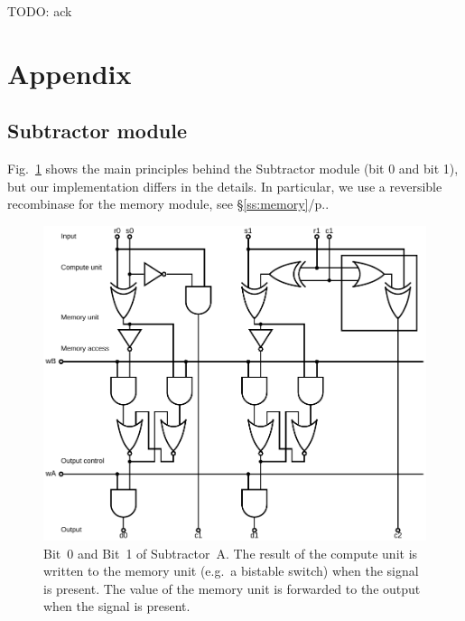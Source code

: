 \documentclass[12pt,notitlepage]{article}
\newcommand{\TODO}[1]{\textrm{\color{red}TODO: #1}}
\begin{document}
\TODO{ack}




\footnotesize


\normalsize

\clearpage


\section*{Appendix}

\subsection{Subtractor module}

Fig.~\ref{f:logical-subtractor01} 
shows the main principles
behind 
the Subtractor module (bit 0 and bit 1),
but our implementation
differs in the details.
%
In particular, we use a reversible recombinase
for the memory module, see \S\ref{ss:memory}/p.\pageref{ss:memory}.

\begin{figure}[phbt]
\centering
\includegraphics[width=0.9\linewidth]{circuits/Logical-HalfSubtractor0.svg.pdf}
%
\caption{%
Bit~0 and Bit~1
of
Subtractor~A.
%
The result of the compute unit is written to the memory unit
(e.g.~a bistable switch)
when the signal  is present.
%
The value of the memory unit is
forwarded to the output
when the signal  is present.
}
\label{f:logical-subtractor01}
\end{figure}
\end{document}
